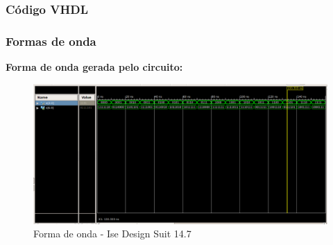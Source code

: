 \documentclass[12pts]{article}
\begin{document}
\newpage
\subsubsection{Código VHDL}



\newpage
\subsubsection{Formas de onda}

\textbf{Forma de onda gerada pelo circuito:}

\begin{figure}[!htb]
  \centering
  \includegraphics[scale=0.35]{imagens/onda_projeto1}
  \caption{Forma de onda - Ise Design Suit 14.7}
  \label{figRotulo}
\end{figure}
\end{document}
